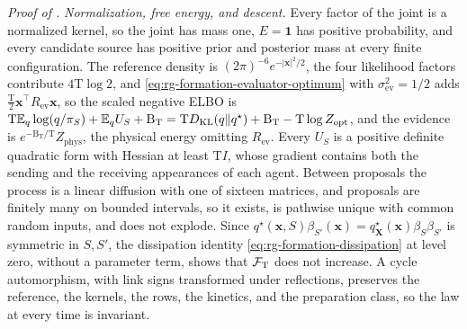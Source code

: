\noindent\emph{Proof of .}
\emph{Normalization, free energy, and descent.} Every factor of the joint is a
normalized kernel, so the joint has mass one, \(E=\mathbf 1\) has positive
probability, and every candidate source has positive prior and posterior mass
at every finite configuration. The reference density is
\((2\pi)^{-6}e^{-|\mathbf x|^2/2}\), the four likelihood factors contribute
\(4\mathrm T\log2\), and \cref{eq:rg-formation-evaluator-optimum} with
\(\sigma^2_{\mathrm{ev}}=1/2\) adds
\(\tfrac{\mathrm T}2\mathbf x^\top R_{\mathrm{ev}}\mathbf x\), so the scaled
negative ELBO is
\(\mathrm T\mathbb E_q\log(q/\pi_S)+\mathbb E_qU_S+\mathrm B_{\mathrm T}
=\mathrm TD_{\mathrm{KL}}(q\Vert q^\star)+\mathrm B_{\mathrm T}-\mathrm T\log Z_{\mathrm{opt}}\),
and the evidence is \(e^{-\mathrm B_{\mathrm T}/\mathrm T}Z_{\mathrm{phys}}\),
the physical energy omitting \(R_{\mathrm{ev}}\). Every \(U_S\) is a positive
definite quadratic form with Hessian at least \(\mathrm TI\), whose gradient
contains both the sending and the receiving appearances of each agent.
Between proposals the process is a linear diffusion with one of sixteen
matrices, and proposals are finitely many on bounded intervals, so it exists,
is pathwise unique with common random inputs, and does not explode. Since
\(q^\star(\mathbf x,S)\beta_{S'}(\mathbf x)
=q^\star_{\mathbf X}(\mathbf x)\beta_S\beta_{S'}\) is symmetric in \(S,S'\), the
dissipation identity \cref{eq:rg-formation-dissipation} at level zero, without
a parameter term, shows that \(\mathcal F_{\mathrm T}\) does not increase. A cycle
automorphism, with link signs transformed under reflections, preserves the
reference, the kernels, the rows, the kinetics, and the preparation class, so
the law at every time is invariant.

